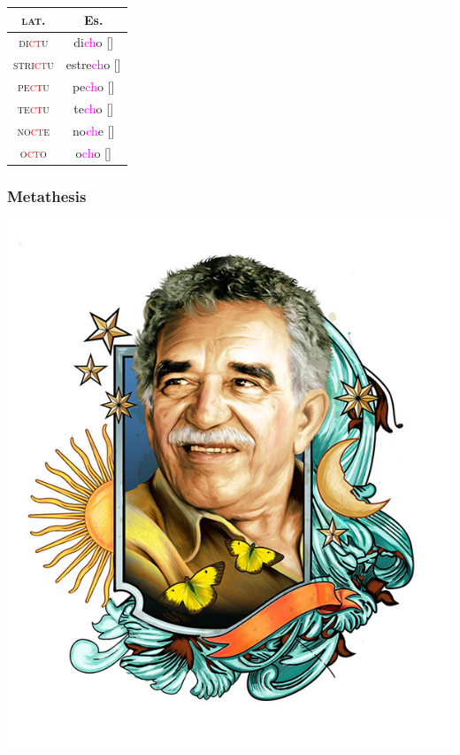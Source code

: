 \documentclass{report}[12pt]
\begin{document}
\begin{tabular}{c c}
  \textsc{lat.} & Es. \\
  \hline
  \textsc{di\textcolor{red}{ct}u} & di\textcolor{magenta}{ch}o [\textipa{\textteshlig}] \\
  \textsc{stri\textcolor{red}{ct}u} & estre\textcolor{magenta}{ch}o [\textipa{\textteshlig}] \\
  \textsc{pe\textcolor{red}{ct}u} & pe\textcolor{magenta}{ch}o [\textipa{\textteshlig}] \\
  \textsc{te\textcolor{red}{ct}u} & te\textcolor{magenta}{ch}o [\textipa{\textteshlig}] \\
  \textsc{no\textcolor{red}{ct}e} & no\textcolor{magenta}{ch}e [\textipa{\textteshlig}] \\
  \textsc{o\textcolor{red}{ct}o} & o\textcolor{magenta}{ch}o [\textipa{\textteshlig}] \\
\end{tabular}

\subsubsection{Metathesis}

\begin{tcolorbox}

\end{tcolorbox}

\pagebreak

\includegraphics[scale=0.75]{marquez.jpg}
\end{document}
